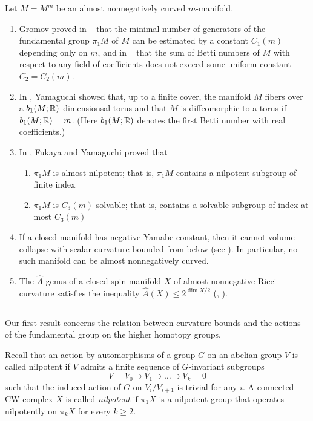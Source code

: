 \documentclass{amsart}
\begin{document}
Let $M=M^m$ be an almost nonnegatively curved $m$-manifold.
\begin{enumerate}[$\diamond$]
\item Gromov proved in ~\cite{G1}
that the minimal number of generators of the fundamental
group $\pi_1M$ of $M$ can be estimated by a constant $C_1(m)$
depending only on $m$,
and in ~\cite{G2} that the sum of Betti numbers of $M$ with
respect to any field of coefficients
does not exceed some uniform constant $C_2=C_2(m)$.
\item In \cite{Yam},
Yamaguchi showed that, up to a finite cover, the manifold $M$
fibers over a $b_1(M;{\Bbb R})$-dimensionsal torus
and that $M$ is diffeomorphic to a torus if $b_1(M;{\Bbb R})\z=m$. (Here $b_1(M;{\Bbb R})$ denotes the first Betti number with real coefficients.)
\item In \cite{FY},
Fukaya and Yamaguchi proved that 
\begin{enumerate}[$\circ$]
\item $\pi_1M$ is almost nilpotent;
that is, $\pi_1M$ contains a nilpotent subgroup of finite index
\item $\pi_1M$ is $C_3(m)$-solvable;
that is, contains a solvable subgroup of index at most $C_3(m)$
\end{enumerate}
\item If a closed manifold has  negative Yamabe constant,
then it cannot volume collapse with scalar curvature bounded from below
(see \cite{Sch,Lb}).  In particular, no such manifold
can be almost nonnegatively curved.
\item The $\hat{A}$-genus of a closed spin manifold $X$
of almost nonnegative Ricci curvature satisfies the inequality
$\hat{A}(X)\le 2^{\dim X/2}$ (\cite{G5}, \cite{Ga}).
\end{enumerate}

\subsection{}
Our first result concerns the relation between curvature bounds and the actions of the fundamental group on the higher homotopy groups.



Recall that an action by automorphisms of a group $G$ on an abelian group $V$
is called nilpotent if $V$
admits a finite sequence of $G$-invariant subgroups
 $$V=V_0\supset V_1\supset\ldots\supset V_k=0$$
such that the induced action of $G$ on $V_i/V_{i+1}$ is trivial for any $i$.
A connected CW-complex $X$ is called {\it nilpotent}
if $\pi_1X$ is a nilpotent group that operates nilpotently
on $\pi_kX$ for every $k\ge 2$.
\end{document}

